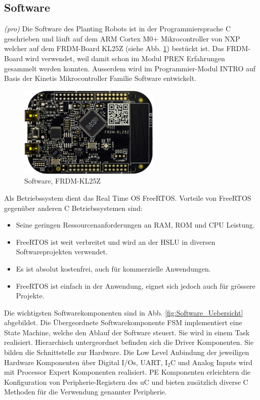 \subsection{Software} \label{kap:Software}

\textit{(pro)} Die Software des Planting Robots ist in der Programmiersprache C geschrieben und läuft auf dem ARM Cortex M0+ Mikrocontroller von NXP welcher auf dem FRDM-Board KL25Z (siehe Abb. \ref{fig:FRDM-KL25Z}) bestückt ist. Das FRDM-Board wird verwendet, weil damit schon im Modul PREN Erfahrungen gesammelt werden konnten. Ausserdem wird im Programmier-Modul INTRO auf Basis der Kinetis Mikrocontroller Familie Software entwickelt.

\begin{figure}[H]
	\includegraphics[width=0.6\textwidth]{Illustrationen/5-Konzept/FRDM-KL25Z.jpg}
	\caption{Software, FRDM-KL25Z \protect\cite{NXP}}
	\label{fig:FRDM-KL25Z}
\end{figure}

Als Betriebssystem dient das Real Time OS FreeRTOS. Vorteile von FreeRTOS gegenüber anderen C Betriebssystemen sind:

\begin{itemize}
	\item Seine geringen Ressourcenanforderungen an RAM, ROM und CPU Leistung. 
	\item FreeRTOS ist weit verbreitet und wird an der HSLU in diversen Softwareprojekten verwendet.
	\item Es ist absolut kostenfrei, auch für kommerzielle Anwendungen.
	\item FreeRTOS ist einfach in der Anwendung, eignet sich jedoch auch für grössere Projekte.
\end{itemize}

Die wichtigsten Softwarekomponenten sind in Abb. \ref{fig:Software_Uebersicht} abgebildet. Die Übergeordnete Softwarekomponente FSM implementiert eine State Machine, welche den Ablauf der Software steuert. Sie wird in einem Task realisiert. Hierarchisch untergeordnet befinden sich die Driver Komponenten. Sie bilden die Schnittstelle zur Hardware. Die Low Level Anbindung der jeweiligen Hardware Komponenten über Digital I/Os, UART, I$_{2}$C und Analog Inputs wird mit Processor Expert Komponenten realisiert. PE Komponenten erleichtern die Konfiguration von Peripherie-Registern des uC und bieten zusätzlich diverse C Methoden für die Verwendung genannter Peripherie. 

